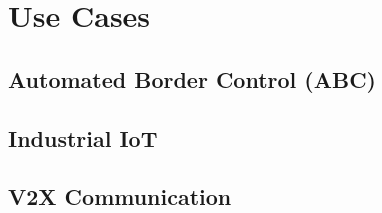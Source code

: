 \chapter{Use Cases}
\label{ch:usecases}

\section{Automated Border Control (ABC)}


\section{Industrial IoT}


\section{V2X Communication}

